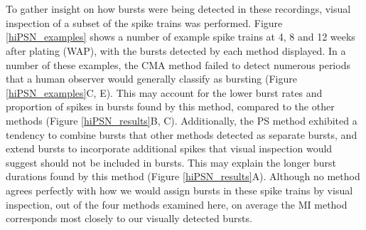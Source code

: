 \documentclass[12pt, titlepage]{article}
\begin{document}
	\\ \\ To gather insight on how bursts were being detected in these recordings, visual inspection of a subset of the spike trains was performed.  Figure \ref{hiPSN_examples} shows a number of example spike trains at 4, 8 and 12 weeks after plating (WAP), with the bursts detected by each method displayed. In a number of these examples, the CMA method failed to detect numerous periods that a human observer would generally classify as bursting (Figure \ref{hiPSN_examples}C, E). This may account for the lower burst rates and proportion of spikes in bursts found by this method, compared to the other methods (Figure \ref{hiPSN_results}B, C). Additionally, the PS method exhibited a tendency to combine bursts that other methods detected as separate bursts, and extend bursts to incorporate additional spikes that visual inspection would suggest should not be included in bursts. This may explain the longer burst durations found by this method (Figure \ref{hiPSN_results}A). Although no method agrees perfectly with how we would assign bursts in these spike trains by visual inspection, out of the four methods examined here, on average the MI method corresponds most closely to our visually detected bursts. 
\end{document}
